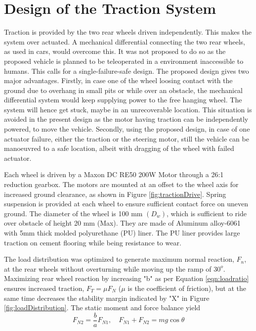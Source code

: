 \section{Design of the Traction System}
Traction is provided by the two rear wheels driven independently. This makes the system over actuated. A mechanical differential connecting the two rear wheels, as used in cars,  would overcome this. It was not proposed to do so as the proposed vehicle is planned to be teleoperated in a environment inaccessible to humans. This calls for a single-failure-safe design. The proposed design gives two major advantages. 
Firstly, in case  one of the wheel loosing contact with the ground due to  overhang in small pits or while over an obstacle, the mechanical differential system would keep supplying power to the free hanging wheel. The system will hence get stuck, maybe in an unrecoverable location. This situation is avoided in the present design as the motor having traction can be independently powered, to move the vehicle.  
Secondly, using the proposed design, in case of one  actuator failure, either the traction or the steering motor, still the vehicle can be manoeuvred to a  safe location, albeit with dragging of the wheel with failed actuator.

    Each wheel is driven by a  Maxon DC RE50 200W Motor through a 26:1 reduction gearbox. The motors are mounted at an offset to the wheel axis for increased ground clearance, as shown in Figure \ref{fig:tractionDrive}. Spring suspension is provided at each wheel to ensure sufficient contact force on uneven  ground. The diameter of the wheel is 100 mm $(D_w)$, which is sufficient to ride over obstacle of height 20 mm (Max). They are made of Aluminum alloy-6061 with 5mm thick molded polyurethane (PU) liner. The PU liner provides large traction on cement flooring while being resistance to wear.

  The load distribution was optimized to generate maximum normal reaction, $F_n$,  at the rear wheels without overturning while moving up the ramp of $30^o$. Maximizing rear wheel reaction by increasing  "b" as per Equation \ref{eqn:loadratio} ensures increased traction, $F_T=\mu F_N$ ($\mu$ is the coefficient of friction), but at the same time decreases the stability margin indicated by "X" in Figure \ref{fig:loadDistribution}. The static moment and force balance yield
\begin{equation}
\label{eqn:loadratio}
F_{N2}=\frac{b}{a}F_{N1}, \quad F_{N1}+F_{N2}=mg\cos\theta
\end{equation}

